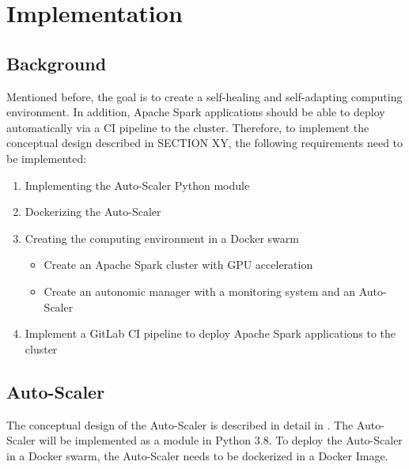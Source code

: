 \chapter{Implementation}
\label{chap:06_implementation}


\section{Background}
Mentioned before, the goal is to create a self-healing and self-adapting computing environment. In addition, Apache Spark applications  should be able to deploy automatically via a CI pipeline to the cluster. Therefore, to implement the conceptual design described in SECTION XY, the following requirements need to be implemented:

\begin{enumerate}
\item Implementing the Auto-Scaler Python module
\item Dockerizing the Auto-Scaler
\item Creating the computing environment in a Docker swarm
\begin{itemize}
\item Create an Apache Spark cluster with GPU acceleration
\item Create an autonomic manager with a monitoring system and an Auto-Scaler
\end{itemize}
\item Implement a GitLab CI pipeline to deploy Apache Spark applications to the cluster
\end{enumerate}


\section{Auto-Scaler}
The conceptual design of the Auto-Scaler is described in detail in . 
The Auto-Scaler will be implemented as a module in Python 3.8.
To deploy the Auto-Scaler in a Docker swarm, the Auto-Scaler needs to be dockerized in a Docker Image.


